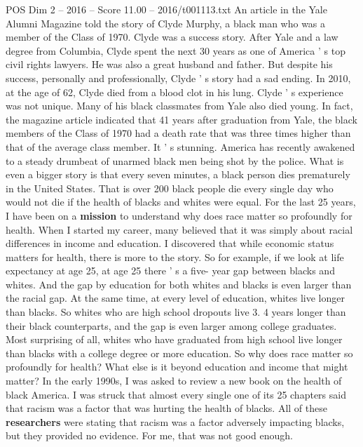 \begin{textsample}{POS Dim 2 – 2016 – Score 11.00 – 2016/t001113.txt}  \label{ex:f2_pos_045}
An article in the Yale Alumni Magazine told the story of Clyde Murphy, a black man who was a member of the Class of 1970.
Clyde was a success story.
After Yale and a law degree from Columbia, Clyde spent the next 30 years as one of America ' s top civil rights lawyers.
He was also a great husband and father.
But despite his success, personally and professionally, Clyde ' s story had a sad ending.
In 2010, at the age of 62, Clyde died from a blood clot in his lung.
Clyde ' s experience was not unique.
Many of his black classmates from Yale also died young.
In fact, the magazine article indicated that 41 years after graduation from Yale, the black members of the Class of 1970 had a death rate that was three times higher than that of the average class member.
It ' s stunning.
America has recently awakened to a steady drumbeat of unarmed black men being shot by the police.
What is even a bigger story is that every seven minutes, a black person dies prematurely in the United States.
That is over 200 black people die every single day who would not die if the health of blacks and whites were equal.
For the last 25 years, I have been on a \textbf{mission} to understand why does race matter so profoundly for health.
When I started my career, many believed that it was simply about racial differences in income and education.
I discovered that while economic status matters for health, there is more to the story.
So for example, if we look at life expectancy at age 25, at age 25 there ' s a five- year gap between blacks and whites.
And the gap by education for both whites and blacks is even larger than the racial gap.
At the same time, at every level of education, whites live longer than blacks.
So whites who are high school dropouts live 3. 4 years longer than their black counterparts, and the gap is even larger among college graduates.
Most surprising of all, whites who have graduated from high school live longer than blacks with a college degree or more education.
So why does race matter so profoundly for health?
What else is it beyond education and income that might matter?
In the early 1990s, I was asked to review a new book on the health of black America.
I was struck that almost every single one of its 25 chapters said that racism was a factor that was hurting the health of blacks.
All of these \textbf{researchers} were stating that racism was a factor adversely impacting blacks, but they provided no evidence.
For me, that was not good enough.

\end{textsample}
